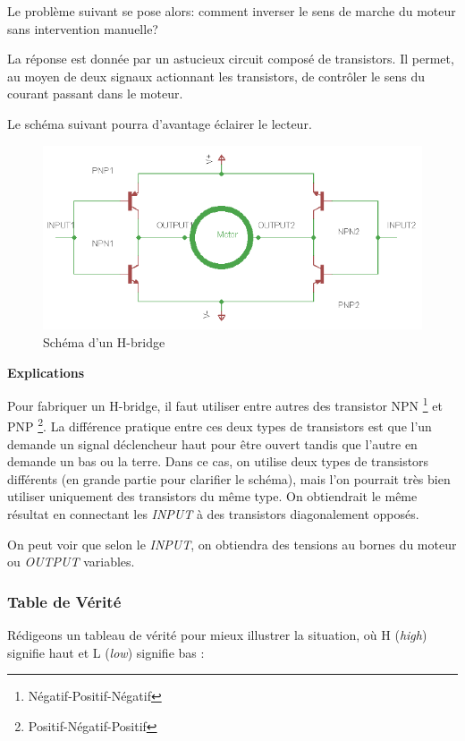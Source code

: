 \documentclass[a4paper,11pt]{report}
\begin{document}
{Le probl\`eme suivant se pose alors: comment inverser le sens de marche du
moteur sans intervention manuelle?

La r\'eponse est donn\'ee par un astucieux circuit compos\'e de
transistors. Il permet, au moyen de deux signaux actionnant les transistors,
de contr\^oler le sens du courant passant dans le moteur.

Le schéma suivant pourra d'avantage \'eclairer le lecteur.

\begin{figure}[h]
\centering
\includegraphics[width=1.0\textwidth]{figures/H-bridge}
    \caption[H-Bridge]{\label{H-bridge}Sch\'ema d'un H-bridge}
\end{figure}

\textbf{Explications}

Pour fabriquer un H-bridge, il faut utiliser entre autres des transistor NPN \footnote{Négatif-Positif-Négatif} et PNP \footnote{Positif-Négatif-Positif}.  La diff\'erence pratique
entre ces deux types de transistors est que l'un demande un signal
d\'eclencheur haut pour \^etre ouvert tandis que l'autre en demande un
bas ou la terre. Dans ce cas, on utilise deux types de transistors
diff\'erents (en grande partie pour clarifier le sch\'ema), mais l'on pourrait
tr\`es bien utiliser uniquement des transistors du m\^eme type. On obtiendrait
le m\^eme r\'esultat en connectant les \emph{INPUT} \`a des transistors
diagonalement oppos\'es\cite{RobotRoom}.

On peut voir que selon le \emph{INPUT}, on obtiendra des tensions au bornes du
moteur ou \emph{OUTPUT} variables.
\subsubsection{Table de V\'erit\'e}
R\'edigeons un tableau de v\'erit\'e pour mieux illustrer la situation, o\`u H
(\textit{high}) signifie haut et L (\textit{low}) signifie bas :


}
\end{document}
